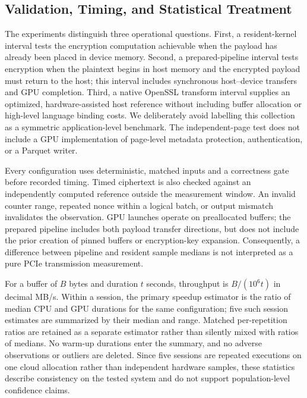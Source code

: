 \subsection{Validation, Timing, and Statistical Treatment}
\label{sec:measurement-policy}
The experiments distinguish three operational questions. First, a
resident-kernel interval tests the encryption computation achievable
when the payload has already been placed in device memory. Second, a
prepared-pipeline interval tests encryption when the plaintext begins
in host memory and the encrypted payload must return to the host;
this interval includes synchronous host--device transfers and GPU
completion. Third, a native OpenSSL transform interval supplies an
optimized, hardware-assisted host reference without including buffer
allocation or high-level language binding costs. We deliberately avoid
labelling this collection as a symmetric application-level benchmark.
The independent-page test does not include a GPU implementation of
page-level metadata protection, authentication, or a Parquet writer.

Every configuration uses deterministic, matched inputs and a correctness
gate before recorded timing. Timed ciphertext is also checked against
an independently computed reference outside the measurement window.
An invalid counter range, repeated nonce within a logical batch, or
output mismatch invalidates the observation. GPU launches operate on
preallocated buffers; the prepared pipeline includes both payload
transfer directions, but does not include the prior creation of pinned
buffers or encryption-key expansion. Consequently, a difference
between pipeline and resident sample medians is not interpreted as a
pure PCIe transmission measurement.

For a buffer of $B$ bytes and duration $t$ seconds, throughput is
$B/(10^6t)$ in decimal MB/s. Within a session, the primary speedup
estimator is the ratio of median CPU and GPU durations for the same
configuration; five such session estimates are summarized by their
median and range. Matched per-repetition ratios are retained as a
separate estimator rather than silently mixed with ratios of medians.
No warm-up durations enter the summary, and no adverse observations
or outliers are deleted. Since five sessions are repeated executions
on one cloud allocation rather than independent hardware samples,
these statistics describe consistency on the tested system and do not
support population-level confidence claims.

